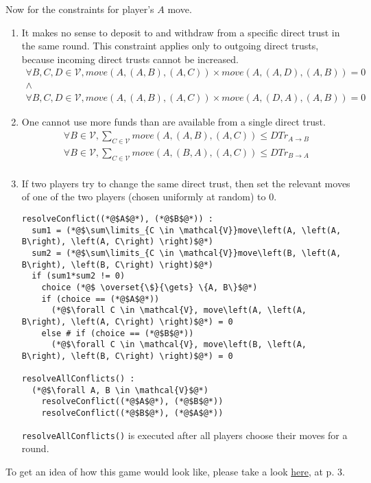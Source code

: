 Now for the constraints for player's $A$ move.

\begin{enumerate}
  \item It makes no sense to deposit to and withdraw from a specific direct trust in the same round. This constraint applies
  only to outgoing direct trusts, because incoming direct trusts cannot be increased.
  \begin{gather*}
    \forall B, C, D \in \mathcal{V}, move\left(A, \left(A, B\right), \left(A, C\right) \right) \times move\left(A, \left(A,
    D\right), \left(A, B\right) \right) = 0 \\
    \wedge \\
    \forall B, C, D \in \mathcal{V}, move\left(A, \left(A, B\right), \left(A, C\right) \right) \times move\left(A, \left(D,
    A\right), \left(A, B\right) \right) = 0
  \end{gather*}

  \item One cannot use more funds than are available from a single direct trust.
  \begin{gather*}
    \forall B \in \mathcal{V}, \sum\limits_{C \in \mathcal{V}} move\left(A, \left(A, B\right), \left(A, C\right) \right)
      \leq DTr_{A \rightarrow B} \\
    \forall B \in \mathcal{V}, \sum\limits_{C \in \mathcal{V}} move\left(A, \left(B, A\right), \left(A, C\right) \right)
      \leq DTr_{B \rightarrow A} \\
  \end{gather*}

  \item If two players try to change the same direct trust, then set the relevant moves of one of the two players (chosen
    uniformly at random) to 0.
  \begin{lstlisting}[label=conflict, style=numbers]
resolveConflict((*@$A$@*), (*@$B$@*)) :
  sum1 = (*@$\sum\limits_{C \in \mathcal{V}}move\left(A, \left(A, B\right), \left(A, C\right) \right)$@*)
  sum2 = (*@$\sum\limits_{C \in \mathcal{V}}move\left(B, \left(A, B\right), \left(B, C\right) \right)$@*)
  if (sum1*sum2 != 0)
    choice (*@$ \overset{\$}{\gets} \{A, B\}$@*)
    if (choice == (*@$A$@*))
      (*@$\forall C \in \mathcal{V}, move\left(A, \left(A, B\right), \left(A, C\right) \right)$@*) = 0
    else # if (choice == (*@$B$@*))
      (*@$\forall C \in \mathcal{V}, move\left(B, \left(A, B\right), \left(B, C\right) \right)$@*) = 0

resolveAllConflicts() :
  (*@$\forall A, B \in \mathcal{V}$@*)
    resolveConflict((*@$A$@*), (*@$B$@*))
    resolveConflict((*@$B$@*), (*@$A$@*))
  \end{lstlisting}
  \texttt{resolveAllConflicts()} is executed after all players choose their moves for a round.
\end{enumerate}

\noindent To get an idea of how this game would look like, please take a look
\href{http://www.agsm.edu.au/bobm/teaching/SGTM/lect06pr-3.pdf}{here}, at p. 3.

\hrulefill
\newpage
